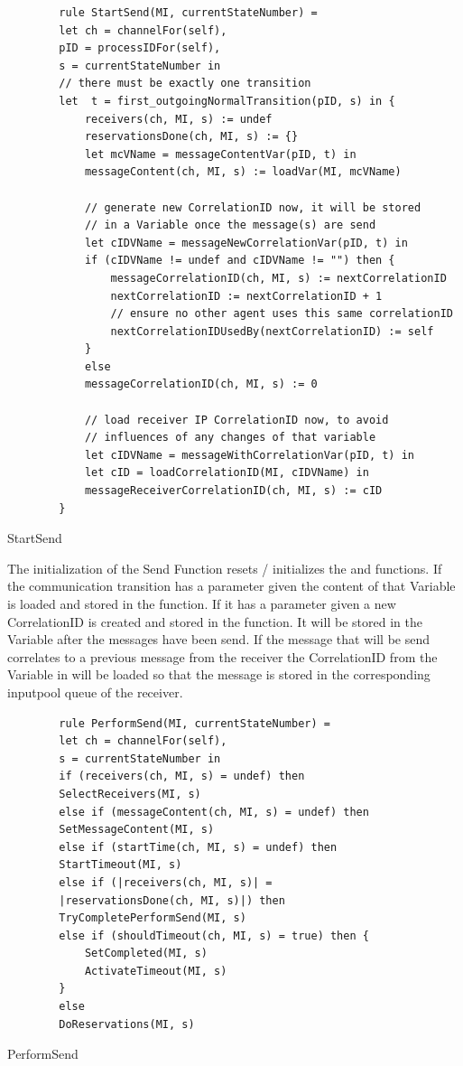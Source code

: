 \begin{listing}[H]
	\begin{verbatim}
		rule StartSend(MI, currentStateNumber) =
		let ch = channelFor(self),
		pID = processIDFor(self),
		s = currentStateNumber in
		// there must be exactly one transition
		let  t = first_outgoingNormalTransition(pID, s) in {
			receivers(ch, MI, s) := undef
			reservationsDone(ch, MI, s) := {}
			let mcVName = messageContentVar(pID, t) in
			messageContent(ch, MI, s) := loadVar(MI, mcVName)
			
			// generate new CorrelationID now, it will be stored
			// in a Variable once the message(s) are send
			let cIDVName = messageNewCorrelationVar(pID, t) in
			if (cIDVName != undef and cIDVName != "") then {
				messageCorrelationID(ch, MI, s) := nextCorrelationID
				nextCorrelationID := nextCorrelationID + 1
				// ensure no other agent uses this same correlationID
				nextCorrelationIDUsedBy(nextCorrelationID) := self
			}
			else
			messageCorrelationID(ch, MI, s) := 0
			
			// load receiver IP CorrelationID now, to avoid
			// influences of any changes of that variable
			let cIDVName = messageWithCorrelationVar(pID, t) in
			let cID = loadCorrelationID(MI, cIDVName) in
			messageReceiverCorrelationID(ch, MI, s) := cID
		}
	\end{verbatim}
	\caption{StartSend}
	\label{lst:shortasm:StartSend}
\end{listing}

The initialization of the Send Function resets / initializes the  and
 functions.
If the communication transition has a  parameter given the
content of that Variable is loaded and stored in the 
function. If it has a  parameter given
a new CorrelationID is created and stored in the  function.
It will be stored in the Variable after the messages have been send.
If the message that will be send correlates to a previous message from the receiver
the CorrelationID from the Variable in  will be loaded
so that the message is stored in the corresponding inputpool queue of the receiver.

\begin{listing}[H]
	\begin{verbatim}
		rule PerformSend(MI, currentStateNumber) =
		let ch = channelFor(self),
		s = currentStateNumber in
		if (receivers(ch, MI, s) = undef) then
		SelectReceivers(MI, s)
		else if (messageContent(ch, MI, s) = undef) then
		SetMessageContent(MI, s)
		else if (startTime(ch, MI, s) = undef) then
		StartTimeout(MI, s)
		else if (|receivers(ch, MI, s)| =
		|reservationsDone(ch, MI, s)|) then
		TryCompletePerformSend(MI, s)
		else if (shouldTimeout(ch, MI, s) = true) then {
			SetCompleted(MI, s)
			ActivateTimeout(MI, s)
		}
		else
		DoReservations(MI, s)
	\end{verbatim}
	\caption{PerformSend}
	\label{lst:shortasm:PerformSend}
\end{listing}

